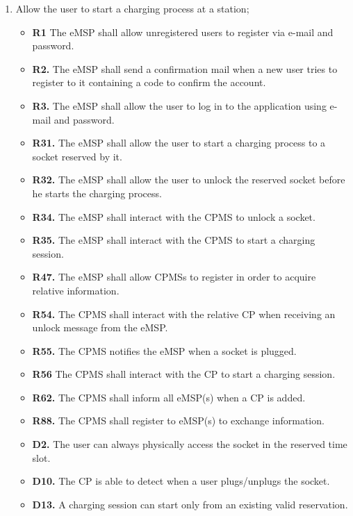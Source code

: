 \documentclass{Configuration_Files/PoliMi3i_thesis}
\begin{document}
\begin{enumerate}[label=\textbf{G\arabic*}]
    \item Allow the user to start a charging process at a station;
        \begin{itemize}
            \item \textbf{R1} The eMSP shall allow unregistered users to register via e-mail and password.
            \item \textbf{R2.} The eMSP shall send a confirmation mail when a new user tries to register to it containing a code to confirm the account.
            \item \textbf{R3.} The eMSP shall allow the user to log in to the application using e-mail and password. 
            \item \textbf{R31.} The eMSP shall allow the user to start a charging process to a socket reserved by it.
            \item \textbf{R32.} The eMSP shall allow the user to unlock the reserved socket before he starts the charging process.
            \item \textbf{R34.} The eMSP shall interact with the CPMS to unlock a socket.
            \item \textbf{R35.} The eMSP shall interact with the CPMS to start a charging session.
            \item \textbf{R47.} The eMSP shall allow CPMSs to register in order to acquire relative information.
            \item \textbf{R54.} The CPMS shall interact with the relative CP when receiving an unlock message from the eMSP.
            \item \textbf{R55.} The CPMS  notifies the eMSP when a socket is plugged.
            \item \textbf{R56} The CPMS shall interact with the CP to start a charging session.
            \item \textbf{R62.} The CPMS shall inform all eMSP(s) when a CP is added.
            \item \textbf{R88.} The CPMS shall register to eMSP(s) to exchange information.
            \item \textbf{D2.} The user can always physically access the socket in the reserved time slot.
            \item \textbf{D10.} The CP is able to detect when a user plugs/unplugs the socket.
            \item \textbf{D13.} A charging session can start only from an existing valid reservation.
        \end{itemize}


\end{enumerate}
\end{document}
